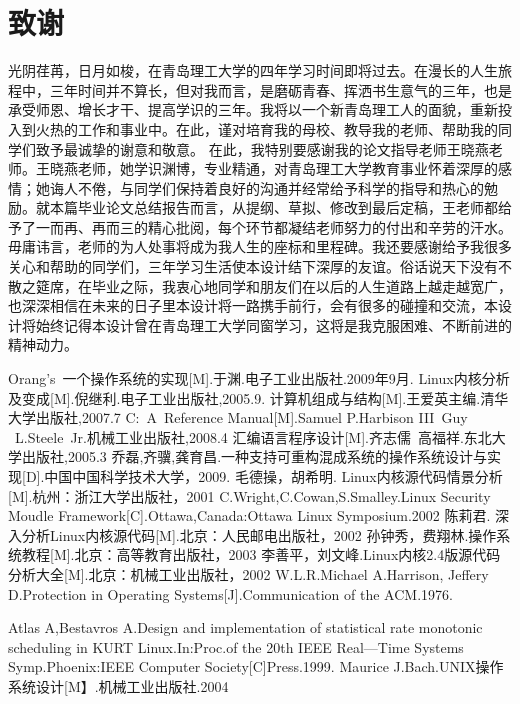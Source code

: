 \documentclass[UTF8,nofonts,cs4size]{ctexrep}
\begin{document}
\chapter*{致谢}
光阴荏苒，日月如梭，在青岛理工大学的四年学习时间即将过去。在漫长的人生旅程中，三年时间并不算长，但对我而言，是磨砺青春、挥洒书生意气的三年，也是承受师恩、增长才干、提高学识的三年。我将以一个新青岛理工人的面貌，重新投入到火热的工作和事业中。在此，谨对培育我的母校、教导我的老师、帮助我的同学们致予最诚挚的谢意和敬意。 在此，我特别要感谢我的论文指导老师王晓燕老师。王晓燕老师，她学识渊博，专业精通，对青岛理工大学教育事业怀着深厚的感情；她诲人不倦，与同学们保持着良好的沟通并经常给予科学的指导和热心的勉励。就本篇毕业论文总结报告而言，从提纲、草拟、修改到最后定稿，王老师都给予了一而再、再而三的精心批阅，每个环节都凝结老师努力的付出和辛劳的汗水。毋庸讳言，老师的为人处事将成为我人生的座标和里程碑。我还要感谢给予我很多关心和帮助的同学们，三年学习生活使本设计结下深厚的友谊。俗话说天下没有不散之筵席，在毕业之际，我衷心地同学和朋友们在以后的人生道路上越走越宽广，也深深相信在未来的日子里本设计将一路携手前行，会有很多的碰撞和交流，本设计将始终记得本设计曾在青岛理工大学同窗学习，这将是我克服困难、不断前进的精神动力。
\label{exception}
\begin{thebibliography}{99}
Orang's\ 一个操作系统的实现[M].于渊.电子工业出版社.2009年9月.
Linux内核分析及变成[M].倪继利.电子工业出版社,2005.9.
计算机组成与结构[M].王爱英主编.清华大学出版社,2007.7
C:\ A\ Reference Manual[M].Samuel P.Harbison III\ Guy \ L.Steele\ Jr.机械工业出版社,2008.4
汇编语言程序设计[M].齐志儒\ 高福祥.东北大学出版社,2005.3
乔磊,齐骥,龚育昌.一种支持可重构混成系统的操作系统设计与实现[D].中国中国科学技术大学，2009.
毛德操，胡希明. Linux内核源代码情景分析[M].杭州：浙江大学出版社，2001
C.Wright,C.Cowan,S.Smalley.Linux Security Moudle Framework[C].Ottawa,Canada:Ottawa Linux Symposium.2002
陈莉君. 深入分析Linux内核源代码[M].北京：人民邮电出版社，2002
孙钟秀，费翔林.操作系统教程[M].北京：高等教育出版社，2003
李善平，刘文峰.Linux内核2.4版源代码分析大全[M].北京：机械工业出版社，2002
W.L.R.Michael A.Harrison, Jeffery D.Protection in Operating Systems[J].Communication of the ACM.1976.

Atlas A,Bestavros A.Design and implementation of statistical rate monotonic scheduling in KURT Linux.In:Proc.of the 20th IEEE Real—Time Systems Symp.Phoenix:IEEE Computer Society[C]Press.1999.
Maurice J.Bach.UNIX操作系统设计[M】.机械工业出版社.2004
\end{thebibliography}
\appendix
\end{document}

